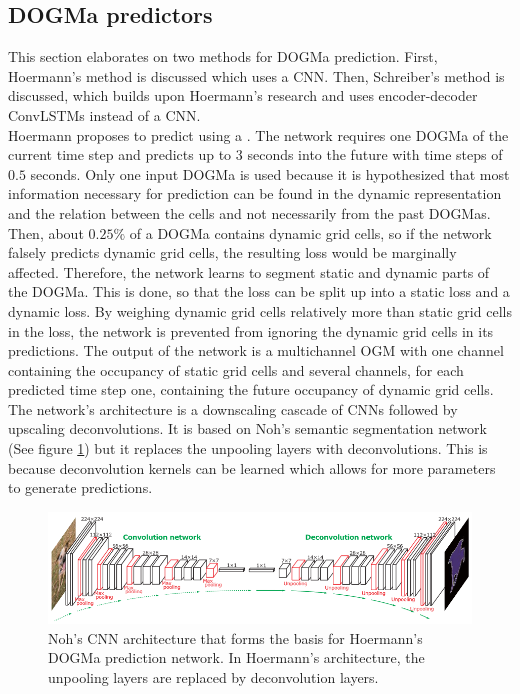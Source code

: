 \subsection{\gls{DOGMa} predictors} \label{subsec:dogma_pred}
This section elaborates on two methods for \gls{DOGMa} prediction. First, Hoermann's \cite{hoermann2018dynamic} method is discussed which uses a \gls{CNN}. Then, Schreiber's \cite{schreiber2019long} method is discussed, which builds upon Hoermann's \cite{hoermann2018dynamic} research and uses encoder-decoder \glspl{ConvLSTM} instead of a \gls{CNN}. \\

Hoermann \cite{hoermann2018dynamic} proposes to predict  using a . The network requires one \gls{DOGMa} of the current time step and predicts up to $3$ seconds into the future with time steps of $0.5$ seconds. Only one input \gls{DOGMa} is used because it is hypothesized that most information necessary for prediction can be found in the dynamic representation and the relation between the cells and not necessarily from the past \glspl{DOGMa}. Then, about $0.25\%$ of a \gls{DOGMa} contains dynamic grid cells, so if the network falsely predicts dynamic grid cells, the resulting loss would be marginally affected. Therefore, the network learns to segment static and dynamic parts of the \gls{DOGMa}. This is done, so that the loss can be split up into a static loss and a dynamic loss. By weighing dynamic grid cells relatively more than static grid cells in the loss, the network is prevented from ignoring the dynamic grid cells in its predictions. The output of the network is a multichannel \gls{OGM} with one channel containing the occupancy of static grid cells and several channels, for each predicted time step one, containing the future occupancy of dynamic grid cells. The network's architecture is a downscaling cascade of \glspl{CNN} followed by upscaling deconvolutions. It is based on Noh's \cite{noh2015learning} semantic segmentation network (See figure \ref{fig:cnn_hoermann}) but it replaces the unpooling layers with deconvolutions. This is because deconvolution kernels can be learned which allows for more parameters to generate predictions.  \\

\begin{figure}[h]
	\centering
	\includegraphics[width=0.8\linewidth]{Figures/Methods/Hoermann_CNN}
	\caption{Noh's \cite{noh2015learning} \gls{CNN} architecture that forms the basis for Hoermann's \cite{hoermann2018dynamic} \gls{DOGMa} prediction network. In Hoermann's \cite{hoermann2018dynamic} architecture, the unpooling layers are replaced by deconvolution layers.}
	\label{fig:cnn_hoermann}
\end{figure}

